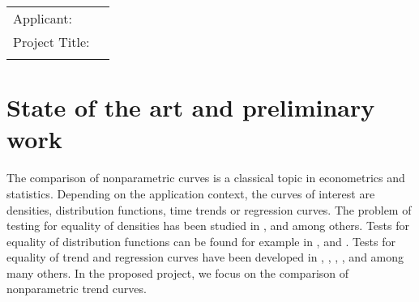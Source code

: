 \documentclass[a4paper,12pt]{article}
\begin{document}
 

\vspace{0.25cm}

\noindent \hrulefill
\vspace{0.5cm}

\noindent\begin{tabular}{ll}
\large{Applicant:} & \noindent {\large Michael Vogt, University of Bonn} \\[0.1cm]
\large{Project Title:} & \noindent {\large New Methods and Theory for the Comparison of} \\
 & \noindent {\large Nonparametric Trend Curves}
\end{tabular}
\vspace{0.5cm}

\noindent \hrulefill



\section{State of the art and preliminary work}\label{sec:stateofart}


The comparison of nonparametric curves is a classical topic in econometrics and statistics. Depending on the application context, the curves of interest are densities, distribution functions, time trends or regression curves. The problem of testing for equality of densities has been studied in \cite{Mammen1992}, \cite{Anderson1994} and \cite{Li2009} among others. Tests for equality of distribution functions can be found for example in \cite{Kiefer1959}, \cite{Anderson1962} and \cite{Finner2018}. Tests for equality of trend and regression curves have been developed in \cite{HaerdleMarron1990}, \cite{Hall1990}, \cite{Delgado1993}, \cite{DegrasWu2012}, \cite{Zhang2012} and \cite{Hidalgo2014} among many others. In the proposed project, we focus on the comparison of nonparametric trend curves.
\end{document}
